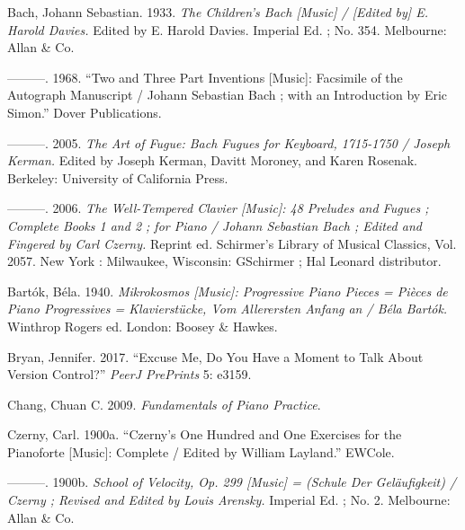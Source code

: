 \documentclass[
]{article}
\newlength{\cslhangindent}
\newenvironment{cslreferences}%
  {\setlength{\parindent}{0pt}%
  \everypar{\setlength{\hangindent}{\cslhangindent}}\ignorespaces}%
  {\par}
\begin{document}
\hypertarget{refs}{}
\begin{cslreferences}
\leavevmode\hypertarget{ref-bach_childrenbachmusic_1933}{}%
Bach, Johann Sebastian. 1933. \emph{The Children's Bach {[}Music{]} / {[}Edited by{]} E. Harold Davies.} Edited by E. Harold Davies. Imperial Ed. ; No. 354. Melbourne: Allan \& Co.

\leavevmode\hypertarget{ref-bach_twothreepart_1968}{}%
---------. 1968. ``Two and Three Part Inventions {[}Music{]}: Facsimile of the Autograph Manuscript / Johann Sebastian Bach ; with an Introduction by Eric Simon.'' Dover Publications.

\leavevmode\hypertarget{ref-bach_artfuguebach_2005}{}%
---------. 2005. \emph{The Art of Fugue: Bach Fugues for Keyboard, 1715-1750 / Joseph Kerman.} Edited by Joseph Kerman, Davitt Moroney, and Karen Rosenak. Berkeley: University of California Press.

\leavevmode\hypertarget{ref-bach_welltemperedclaviermusic_2006}{}%
---------. 2006. \emph{The Well-Tempered Clavier {[}Music{]}: 48 Preludes and Fugues ; Complete Books 1 and 2 ; for Piano / Johann Sebastian Bach ; Edited and Fingered by Carl Czerny.} Reprint ed. Schirmer's Library of Musical Classics, Vol. 2057. New York : Milwaukee, Wisconsin: GSchirmer ; Hal Leonard distributor.

\leavevmode\hypertarget{ref-bartok_mikrokosmosmusicprogressive_1940}{}%
Bartók, Béla. 1940. \emph{Mikrokosmos {[}Music{]}: Progressive Piano Pieces = Pièces de Piano Progressives = Klavierstücke, Vom Allerersten Anfang an / Béla Bartók.} Winthrop Rogers ed. London: Boosey \& Hawkes.

\leavevmode\hypertarget{ref-Bryan2017ExcuseMD}{}%
Bryan, Jennifer. 2017. ``Excuse Me, Do You Have a Moment to Talk About Version Control?'' \emph{PeerJ PrePrints} 5: e3159.

\leavevmode\hypertarget{ref-chang_fundamentalspianopractice_2009a}{}%
Chang, Chuan C. 2009. \emph{Fundamentals of Piano Practice}.

\leavevmode\hypertarget{ref-czerny_czernyonehundred_1900}{}%
Czerny, Carl. 1900a. ``Czerny's One Hundred and One Exercises for the Pianoforte {[}Music{]}: Complete / Edited by William Layland.'' EWCole.

\leavevmode\hypertarget{ref-czerny_schoolvelocityop_1900}{}%
---------. 1900b. \emph{School of Velocity, Op. 299 {[}Music{]} = (Schule Der Geläufigkeit) / Czerny ; Revised and Edited by Louis Arensky.} Imperial Ed. ; No. 2. Melbourne: Allan \& Co.


\end{cslreferences}
\end{document}
